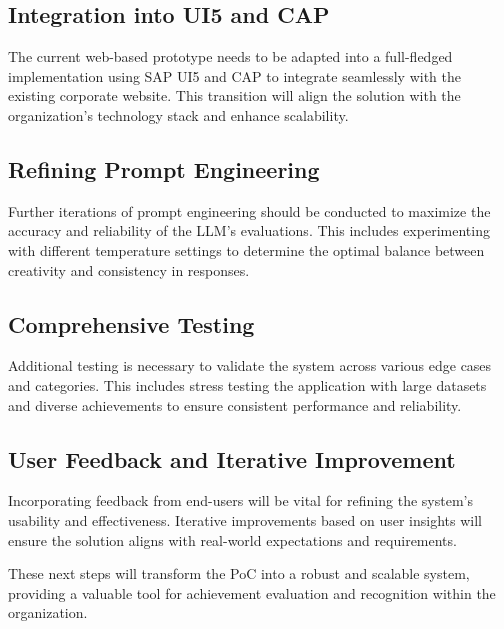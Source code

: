 \subsection*{Integration into UI5 and CAP}
The current web-based prototype needs to be adapted into a full-fledged implementation using SAP UI5 and CAP to integrate seamlessly with the existing corporate website. 
This transition will align the solution with the organization's technology stack and enhance scalability.

\subsection*{Refining Prompt Engineering}
Further iterations of prompt engineering should be conducted to maximize the accuracy and reliability of the \ac{LLM}'s evaluations. 
This includes experimenting with different temperature settings to determine the optimal balance between creativity and consistency in responses.

\subsection*{Comprehensive Testing}
Additional testing is necessary to validate the system across various edge cases and categories. 
This includes stress testing the application with large datasets and diverse achievements to ensure consistent performance and reliability.

\subsection*{User Feedback and Iterative Improvement}
Incorporating feedback from end-users will be vital for refining the system's usability and effectiveness. 
Iterative improvements based on user insights will ensure the solution aligns with real-world expectations and requirements.

These next steps will transform the \ac{PoC} into a robust and scalable system, providing a valuable tool for achievement evaluation and recognition within the organization.
